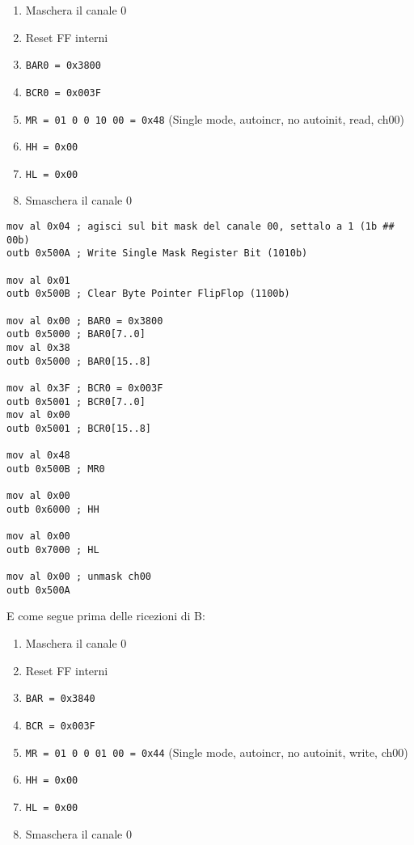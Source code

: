 \documentclass[a4paper]{article}
\begin{document}
\begin{enumerate}
\item Maschera il canale 0

\item Reset FF interni

\item \texttt{BAR0 = 0x3800}

\item \texttt{BCR0 = 0x003F}

\item \texttt{MR = 01 0 0 10 00 = 0x48} (Single mode, autoincr, no autoinit, read, ch00)

\item \texttt{HH = 0x00}

\item \texttt{HL = 0x00}

\item Smaschera il canale 0

\end{enumerate}

\begin{verbatim}
mov al 0x04 ; agisci sul bit mask del canale 00, settalo a 1 (1b ## 00b)
outb 0x500A ; Write Single Mask Register Bit (1010b)

mov al 0x01
outb 0x500B ; Clear Byte Pointer FlipFlop (1100b)

mov al 0x00 ; BAR0 = 0x3800
outb 0x5000 ; BAR0[7..0]
mov al 0x38
outb 0x5000 ; BAR0[15..8]

mov al 0x3F ; BCR0 = 0x003F
outb 0x5001 ; BCR0[7..0]
mov al 0x00
outb 0x5001 ; BCR0[15..8]

mov al 0x48
outb 0x500B ; MR0

mov al 0x00
outb 0x6000 ; HH

mov al 0x00
outb 0x7000 ; HL

mov al 0x00 ; unmask ch00
outb 0x500A

\end{verbatim}

E come segue prima delle ricezioni di B:

\begin{enumerate}

\item Maschera il canale 0

\item Reset FF interni

\item \texttt{BAR = 0x3840}

\item \texttt{BCR = 0x003F}

\item \texttt{MR = 01 0 0 01 00 = 0x44} (Single mode, autoincr, no autoinit, write, ch00)

\item \texttt{HH = 0x00}

\item \texttt{HL = 0x00}

\item Smaschera il canale 0
\end{enumerate}
\end{document}
